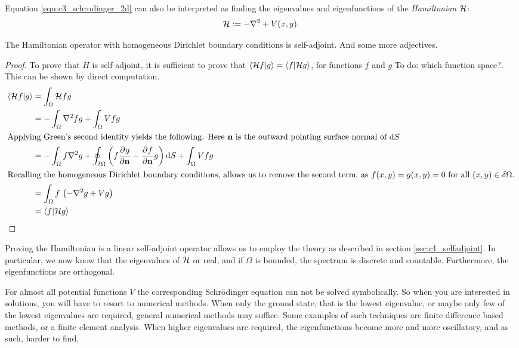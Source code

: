 Equation \eqref{equ:c3_schrodinger_2d} can also be interpreted as finding the eigenvalues and eigenfunctions of the \emph{Hamiltonian} $\mathcal{H}$:
$$
    \mathcal{H} := -\nabla^2 + V(x, y)\text{.}
$$
\begin{theorem}
    The Hamiltonian operator with homogeneous Dirichlet boundary conditions is self-adjoint. And some more adjectives.
\end{theorem}
\begin{proof}
    To prove that $H$ is self-adjoint, it is sufficient to prove that $\bra{\mathcal{H} f}\ket{g} = \bra{f}\ket{\mathcal{H} g}$, for functions $f$ and $g$ {\color{red} To do: which function space?}. This can be shown by direct computation.
    \begin{align*}
        \bra{\mathcal{H} f}\ket{g} & = \int_\Omega \mathcal{H} f g                                                                                                        \\
                                    & = -\int_\Omega \nabla^2 f g + \int_\Omega V f g                                                                                       \\
        \intertext{Applying Green's second identity yields the following. Here $\vb{n}$ is the outward pointing surface normal of $\dd S$ }
                                    & = -\int_\Omega f \nabla^2 g + \oint_{\delta\Omega} \left( f \pdv[]{g}{\vb{n}} - \pdv[]{f}{\vb{n}} g  \right)\dd S + \int_\Omega V f g \\
        \intertext{Recalling the homogeneous Dirichlet boundary conditions, allows us to remove the second term, as $f(x,y) = g(x, y) = 0$ for all $(x, y) \in \delta\Omega$.}
                                    & =\int_\Omega f\,\left(-\nabla^2 g  + V g\right)                                                                                       \\
                                    & = \bra{f}\ket{\mathcal{H} g}
    \end{align*}
\end{proof}

Proving the Hamiltonian is a linear self-adjoint operator allows us to employ the theory as described in section \ref{sec:c1_selfadjoint}. In particular, we now know that the eigenvalues of $\mathcal{H}$ or real, and if $\Omega$ is bounded, the spectrum is discrete and countable. Furthermore, the eigenfunctions are orthogonal.

For almost all potential functions $V$ the corresponding Schrödinger equation can not be solved symbolically. So when you are interested in solutions, you will have to resort to numerical methods. When only the ground state, that is the lowest eigenvalue, or maybe only few of the lowest eigenvalues are required, general numerical methods may suffice. Some examples of such techniques are finite difference based methods, or a finite element analysis. When higher eigenvalues are required, the eigenfunctions become more and more oscillatory, and as such, harder to find.

